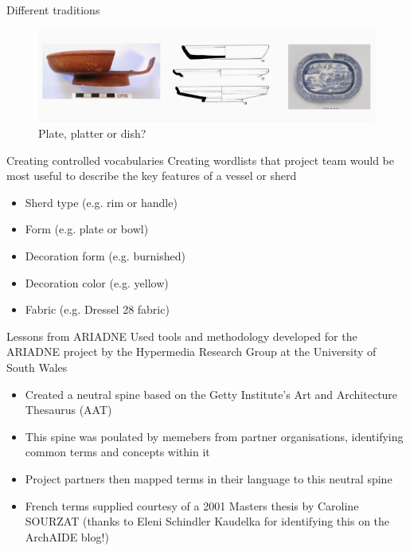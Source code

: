 \documentclass[xcolor=x11names, aspectratio=169,usenames,dvipsnames]{beamer}
\begin{document}
\begin{frame}{Different traditions}
\begin{center}
\begin{figure}
\includegraphics[width=\textwidth]{img/tim_plate_platter_dish.jpg}
\caption{Plate, platter or dish?}
\end{figure}
\end{center}
\end{frame}

\begin{frame}{Creating controlled vocabularies}
Creating wordlists that project team would be most useful to describe the key features of a vessel or sherd
\begin{itemize}
\item Sherd type (e.g. rim or handle)
\item Form (e.g. plate or bowl)
\item Decoration form (e.g. burnished)
\item Decoration color (e.g. yellow)
\item Fabric (e.g. Dressel 28 fabric)
\end{itemize}
\end{frame}

\begin{frame}{Lessons from ARIADNE}
\hfill{}\newline
Used tools and methodology developed for the ARIADNE project by the Hypermedia Research Group at the University of South Wales \newline
\begin{itemize}
\item Created a neutral spine based on the Getty Institute's Art and Architecture Thesaurus (AAT)
\item This spine was poulated by memebers from partner organisations, identifying common terms and concepts within it
\item Project partners then mapped terms in their language to this neutral spine
\item French terms supplied courtesy of a 2001 Masters thesis by Caroline SOURZAT (thanks to Eleni Schindler Kaudelka for identifying this on the ArchAIDE blog!)
\end{itemize}
\end{frame}
\end{document}
